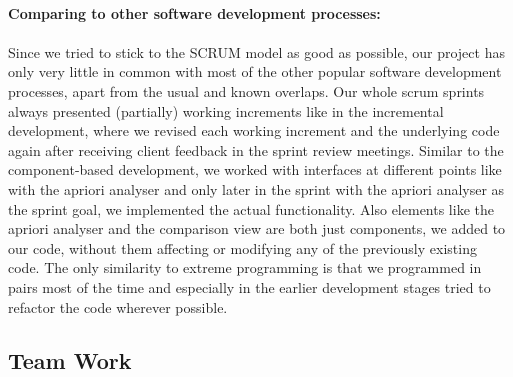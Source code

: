 \ \\
{\large\textbf{Comparing to other software development processes:}}\\ 
\ \\
Since we tried to stick to the SCRUM model as good as possible, our project has only very little in common with most of the other popular software development processes, apart from the usual and known overlaps. Our whole scrum sprints always presented (partially) working increments like in the incremental development, where we revised each working increment and the underlying code again after receiving client feedback in the sprint review meetings. Similar to the component-based development, we worked with interfaces at different points like with the apriori analyser and only later in the sprint with the apriori analyser as the sprint goal, we implemented the actual functionality. Also elements like the apriori analyser and the comparison view are both just components, we added to our code, without them affecting or modifying any of the previously existing code. The only similarity to extreme programming is that we programmed in pairs most of the time and especially in the earlier development stages tried to refactor the code wherever possible.\\


\subsection{Team Work}

